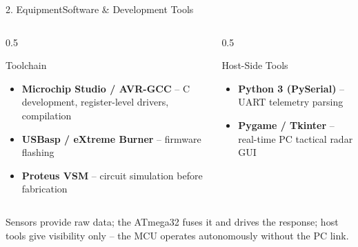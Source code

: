 \documentclass[aspectratio=169, 10pt]{beamer}
\begin{document}
\begin{frame}{2. Equipment}{Software \& Development Tools}
    \begin{columns}[T]
        \begin{column}{0.5\textwidth}
            \begin{block}{Toolchain}
                \small
                \begin{itemize}
                    \item \textbf{Microchip Studio / AVR-GCC} -- C development, register-level drivers, compilation
                    \item \textbf{USBasp / eXtreme Burner} -- firmware flashing
                    \item \textbf{Proteus VSM} -- circuit simulation before fabrication
                \end{itemize}
            \end{block}
        \end{column}
        \begin{column}{0.5\textwidth}
            \begin{block}{Host-Side Tools}
                \small
                \begin{itemize}
                    \item \textbf{Python 3 (PySerial)} -- UART telemetry parsing
                    \item \textbf{Pygame / Tkinter} -- real-time PC tactical radar GUI
                \end{itemize}
            \end{block}
        \end{column}
    \end{columns}
    \vspace{0.2cm}
    \footnotesize\color{Dim} Sensors provide raw data; the ATmega32 fuses it and drives the response; host tools give visibility only -- the MCU operates autonomously without the PC link.
\end{frame}
\end{document}
